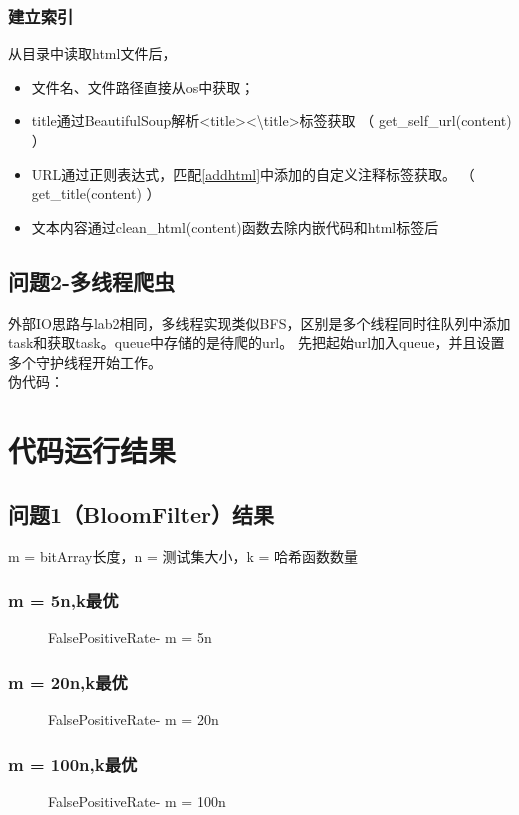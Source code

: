 \documentclass[12pt,a4paper]{article}
\begin{document}
\subsubsection{建立索引}
从目录中读取html文件后，
\begin{itemize}
\item 文件名、文件路径直接从os中获取；
\item title通过BeautifulSoup解析<title><\textbackslash title>标签获取  （ get{\_}self{\_}url(content) ）
\item URL通过正则表达式，匹配\ref{addhtml}中添加的自定义注释标签获取。 （ get{\_}title(content) ）
\item 文本内容通过clean{\_}html(content)函数去除内嵌代码和html标签后

\end{itemize}
\subsection{问题2-多线程爬虫}
外部IO思路与lab2相同，多线程实现类似BFS，区别是多个线程同时往队列中添加task和获取task。queue中存储的是待爬的url。
先把起始url加入queue，并且设置多个守护线程开始工作。\\
伪代码：\\

\newpage
\section{代码运行结果}
\subsection{问题1（BloomFilter）结果}
m = bitArray长度，n = 测试集大小，k = 哈希函数数量
\subsubsection{m = 5n,k最优}
\begin{figure}[H]
	\centering
	 \caption{FalsePositiveRate- m = 5n}
\end{figure}
\subsubsection{m = 20n,k最优}
\begin{figure}[H]
	\centering
	 \caption{FalsePositiveRate- m = 20n}
\end{figure}

\subsubsection{m = 100n,k最优}
\begin{figure}[H]
	\centering
	 \caption{FalsePositiveRate- m = 100n}
\end{figure}
\end{document}
